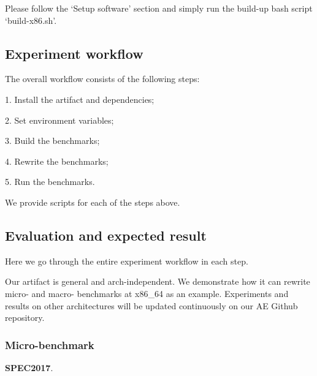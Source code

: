 \documentclass{sigplanconf}
\begin{document}
{Please follow the `Setup software' section and simply run the build-up bash script `build-x86.sh'.


\subsection{Experiment workflow}

The overall workflow consists of the following steps:

1. Install the artifact and dependencies;

2. Set environment variables;

3. Build the benchmarks;

4. Rewrite the benchmarks;

5. Run the benchmarks.

We provide scripts for each of the steps above.

\subsection{Evaluation and expected result}


Here we go through the entire experiment workflow in each step.

Our artifact is general and arch-independent. We demonstrate how it can rewrite micro-
and macro- benchmarks at x86\_64 as an example. Experiments and results on other architectures will be
updated continuously on our AE Github repository.



\subsubsection{Micro-benchmark}

\vspace{2pt}\noindent\textbf{SPEC2017}.

}
\end{document}
